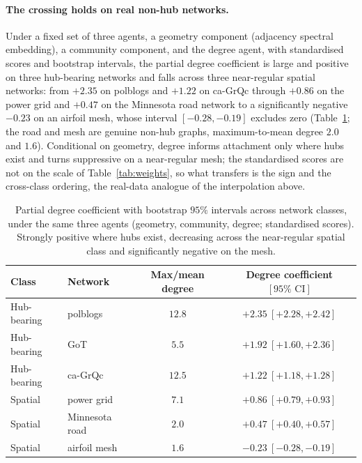\documentclass[12pt]{article}
\newcommand{\1}{\mathbf{1}}
\begin{document}
\paragraph{The crossing holds on real non-hub networks.} Under a fixed set of three agents, a geometry component (adjacency spectral embedding), a community component, and the degree agent, with standardised scores and bootstrap intervals, the partial degree coefficient is large and positive on three hub-bearing networks and falls across three near-regular spatial networks: from $+2.35$ on \textsf{polblogs} and $+1.22$ on \textsf{ca-GrQc} through $+0.86$ on the power grid and $+0.47$ on the Minnesota road network to a significantly negative $-0.23$ on an airfoil mesh, whose interval $[-0.28,-0.19]$ excludes zero (Table~\ref{tab:crossnet}; the road and mesh are genuine non-hub graphs, maximum-to-mean degree $2.0$ and $1.6$). Conditional on geometry, degree informs attachment only where hubs exist and turns suppressive on a near-regular mesh; the standardised scores are not on the scale of Table~\ref{tab:weights}, so what transfers is the sign and the cross-class ordering, the real-data analogue of the interpolation above.

\begin{table}[t]
\centering
\small
\caption{Partial degree coefficient with bootstrap $95\%$ intervals across network classes, under the same three agents (geometry, community, degree; standardised scores). Strongly positive where hubs exist, decreasing across the near-regular spatial class and significantly negative on the mesh.}
\label{tab:crossnet}
\begin{tabular}{llcc}
\toprule
Class & Network & Max/mean degree & Degree coefficient $[95\%\text{ CI}]$\\
\midrule
Hub-bearing & \textsf{polblogs} & $12.8$ & $+2.35\ [+2.28,+2.42]$\\
Hub-bearing & \textsf{GoT} & $5.5$ & $+1.92\ [+1.60,+2.36]$\\
Hub-bearing & \textsf{ca-GrQc} & $12.5$ & $+1.22\ [+1.18,+1.28]$\\
\midrule
Spatial & power grid & $7.1$ & $+0.86\ [+0.79,+0.93]$\\
Spatial & Minnesota road & $2.0$ & $+0.47\ [+0.40,+0.57]$\\
Spatial & airfoil mesh & $1.6$ & $-0.23\ [-0.28,-0.19]$\\
\bottomrule
\end{tabular}
\end{table}
\end{document}
